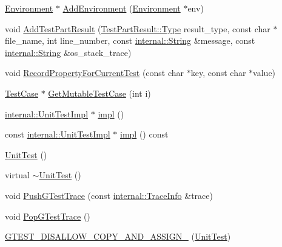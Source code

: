 \begin{DoxyCompactItemize}
\item 
\hyperlink{classtesting_1_1Environment}{\-Environment} $\ast$ \hyperlink{classtesting_1_1UnitTest_a615f6515c254c5ddda5f695e25da3da3}{\-Add\-Environment} (\hyperlink{classtesting_1_1Environment}{\-Environment} $\ast$env)
\item 
void \hyperlink{classtesting_1_1UnitTest_a4b89ae9b48ae834488a0831f0bd19e80}{\-Add\-Test\-Part\-Result} (\hyperlink{classtesting_1_1TestPartResult_a1d1cfd8ffb84e947f82999c682b666a7}{\-Test\-Part\-Result\-::\-Type} result\-\_\-type, const char $\ast$file\-\_\-name, int line\-\_\-number, const \hyperlink{classtesting_1_1internal_1_1String}{internal\-::\-String} \&message, const \hyperlink{classtesting_1_1internal_1_1String}{internal\-::\-String} \&os\-\_\-stack\-\_\-trace)
\item 
void \hyperlink{classtesting_1_1UnitTest_aa7b2e142a716c9c6653a6f35a722ec9e}{\-Record\-Property\-For\-Current\-Test} (const char $\ast$key, const char $\ast$value)
\item 
\hyperlink{classtesting_1_1TestCase}{\-Test\-Case} $\ast$ \hyperlink{classtesting_1_1UnitTest_aed9ba9977fbd9b36e14b42fe9d72bfed}{\-Get\-Mutable\-Test\-Case} (int i)
\item 
\hyperlink{classtesting_1_1internal_1_1UnitTestImpl}{internal\-::\-Unit\-Test\-Impl} $\ast$ \hyperlink{classtesting_1_1UnitTest_a7fc0e26510d98598fc6632b7e66a281d}{impl} ()
\item 
const \hyperlink{classtesting_1_1internal_1_1UnitTestImpl}{internal\-::\-Unit\-Test\-Impl} $\ast$ \hyperlink{classtesting_1_1UnitTest_a9e09ad1a908343372936c818963a15e0}{impl} () const 
\item 
\hyperlink{classtesting_1_1UnitTest_a3c5dacde37a0ec6c0bf79322f7e355ed}{\-Unit\-Test} ()
\item 
virtual \hyperlink{classtesting_1_1UnitTest_a103aeda10e620c4427e2196b705bb64b}{$\sim$\-Unit\-Test} ()
\item 
void \hyperlink{classtesting_1_1UnitTest_a5ea77a45b0cd359476236407bff9bb51}{\-Push\-G\-Test\-Trace} (const \hyperlink{structtesting_1_1internal_1_1TraceInfo}{internal\-::\-Trace\-Info} \&trace)
\item 
void \hyperlink{classtesting_1_1UnitTest_a89acfaaaf4015731b91b26fd8a6f0887}{\-Pop\-G\-Test\-Trace} ()
\item 
\hyperlink{classtesting_1_1UnitTest_ac289f1ec47dc2e475bff4e77364d5571}{\-G\-T\-E\-S\-T\-\_\-\-D\-I\-S\-A\-L\-L\-O\-W\-\_\-\-C\-O\-P\-Y\-\_\-\-A\-N\-D\-\_\-\-A\-S\-S\-I\-G\-N\-\_\-} (\hyperlink{classtesting_1_1UnitTest}{\-Unit\-Test})

\end{DoxyCompactItemize}
